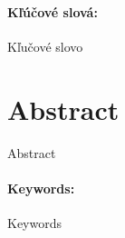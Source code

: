 \documentclass[12pt, oneside]{book}
\begin{document}
\paragraph*{Kľúčové slová:} Kľučové slovo


\newpage 
\section*{Abstract}

Abstract

\paragraph*{Keywords:} Keywords


%
%



\newpage 

\tableofcontents



\newpage 

\listoffigures


\mainmatter


 





%





\end{document}
